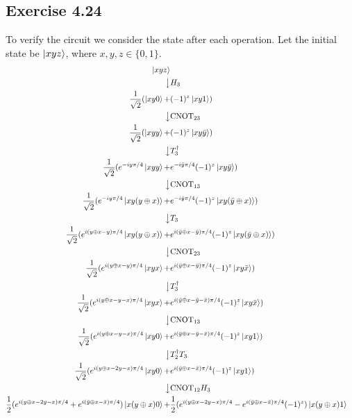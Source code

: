 \documentclass[a4paper,12pt]{article}
\begin{document}
\subsection*{Exercise 4.24}
To verify the circuit we consider the state after each operation. Let the initial state be $\ket{xyz}$, where 
$x,y,z\in\{0,1\}$.\\
\begingroup
\allowdisplaybreaks
\begin{align*}
    \ket{xyz}\\
\big\downarrow &H_3\\
\frac{1}{\sqrt{2}}(\ket{xy0}+&(-1)^z\ket{xy1})\\
\big\downarrow &\text{CNOT}_{23}\\
\frac{1}{\sqrt{2}}(\ket{xyy} +&(-1)^z\ket{xy\bar{y}})\\
\big\downarrow &T^\dagger_3 \\
\frac{1}{\sqrt{2}}(e^{-iy\pi/4}\ket{xyy} +&e^{-i\bar{y}\pi/4}(-1)^z\ket{xy\bar{y}})\\
\big\downarrow &\text{CNOT}_{13}\\
\frac{1}{\sqrt{2}}(e^{-iy\pi/4}\ket{xy(y\oplus x)} +&e^{-i\bar{y}\pi/4}(-1)^z\ket{xy(\bar{y}\oplus x)})\\
\big\downarrow & T_3\\
\frac{1}{\sqrt{2}}(e^{i(y\oplus x - y)\pi/4}\ket{xy(y\oplus x)} +&e^{i(\bar{y}\oplus x -\bar{y})\pi/4}(-1)^z\ket{xy(\bar{y}\oplus x)})\\
\big\downarrow &\text{CNOT}_{23}\\
\frac{1}{\sqrt{2}}(e^{i(y\oplus x - y)\pi/4}\ket{xyx} +&e^{i(\bar{y}\oplus x -\bar{y})\pi/4}(-1)^z\ket{xy\bar{x}})\\
\big\downarrow & T^\dagger_3 \\
\frac{1}{\sqrt{2}}(e^{i(y\oplus x - y-x)\pi/4}\ket{xyx} +&e^{i(\bar{y}\oplus x -\bar{y}-\bar{x})\pi/4}(-1)^z\ket{xy\bar{x}})\\
\big\downarrow &\text{CNOT}_{13}\\
\frac{1}{\sqrt{2}}(e^{i(y\oplus x - y-x)\pi/4}\ket{xy0} +&e^{i(\bar{y}\oplus x -\bar{y}-\bar{x})\pi/4}(-1)^z\ket{xy1})\\
\big\downarrow & T_2^\dagger T_3\\
\frac{1}{\sqrt{2}}(e^{i(y\oplus x - 2y-x)\pi/4}\ket{xy0} +&e^{i(\bar{y}\oplus x -\bar{x})\pi/4}(-1)^z\ket{xy1})\\
\big\downarrow &\text{CNOT}_{12}H_3\\
\frac{1}{2}(e^{i(y\oplus x - 2y-x)\pi/4}+e^{i(\bar{y}\oplus x -\bar{x})\pi/4})\ket{x(y\oplus x)0} 
+&\frac{1}{2}(e^{i(y\oplus x - 2y-x)\pi/4}-e^{i(\bar{y}\oplus x -\bar{x})\pi/4}(-1)^z)\ket{x(y\oplus x)1}\\

\end{align*}
\end{document}
